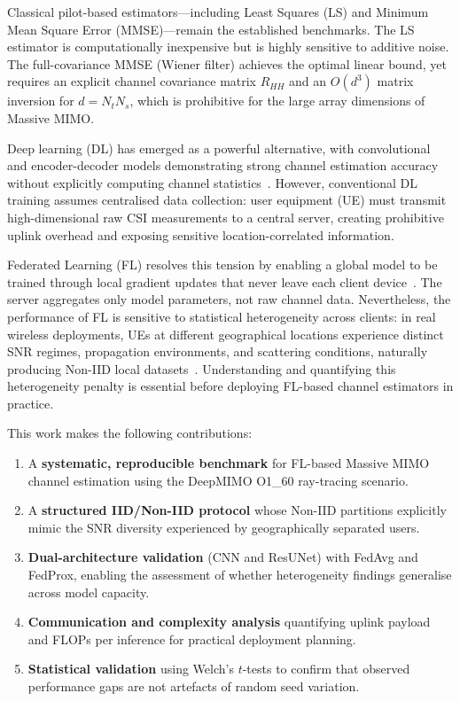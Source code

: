 \documentclass[runningheads]{llncs}
\begin{document}
Classical pilot-based estimators---including Least Squares (LS) and
Minimum Mean Square Error (MMSE)---remain the established benchmarks.
The LS estimator is computationally inexpensive but is highly sensitive
to additive noise.  The full-covariance MMSE (Wiener filter) achieves
the optimal linear bound, yet requires an explicit channel covariance
matrix $R_{HH}$ and an $O(d^3)$ matrix inversion for $d = N_t N_s$,
which is prohibitive for the large array dimensions of Massive MIMO.

Deep learning (DL) has emerged as a powerful alternative, with
convolutional and encoder-decoder models demonstrating strong channel
estimation accuracy without explicitly computing channel
statistics~\cite{wen2018deep,he2018deep,ye2018power,soltani2019deep}.
However, conventional DL training assumes centralised data collection:
user equipment (UE) must transmit high-dimensional raw CSI measurements
to a central server, creating prohibitive uplink overhead and exposing
sensitive location-correlated information.

Federated Learning (FL) resolves this tension by enabling a global
model to be trained through local gradient updates that never leave each
client device~\cite{mcmahan2017fedavg,kairouz2021survey}.  The server
aggregates only model parameters, not raw channel data.  Nevertheless,
the performance of FL is sensitive to statistical heterogeneity across
clients: in real wireless deployments, UEs at different geographical
locations experience distinct SNR regimes, propagation environments, and
scattering conditions, naturally producing Non-IID local
datasets~\cite{ghosh2019robust}.  Understanding and quantifying this
heterogeneity penalty is essential before deploying FL-based channel
estimators in practice.

This work makes the following contributions:
\begin{enumerate}
  \item A \textbf{systematic, reproducible benchmark} for FL-based
        Massive MIMO channel estimation using the DeepMIMO O1\_60
        ray-tracing scenario.
  \item A \textbf{structured IID/Non-IID protocol} whose Non-IID
        partitions explicitly mimic the SNR diversity experienced by
        geographically separated users.
  \item \textbf{Dual-architecture validation} (CNN and ResUNet) with
        FedAvg and FedProx, enabling the assessment of whether
        heterogeneity findings generalise across model capacity.
  \item \textbf{Communication and complexity analysis} quantifying
        uplink payload and FLOPs per inference for practical deployment
        planning.
  \item \textbf{Statistical validation} using Welch's $t$-tests to
        confirm that observed performance gaps are not artefacts of
        random seed variation.
\end{enumerate}
\end{document}
